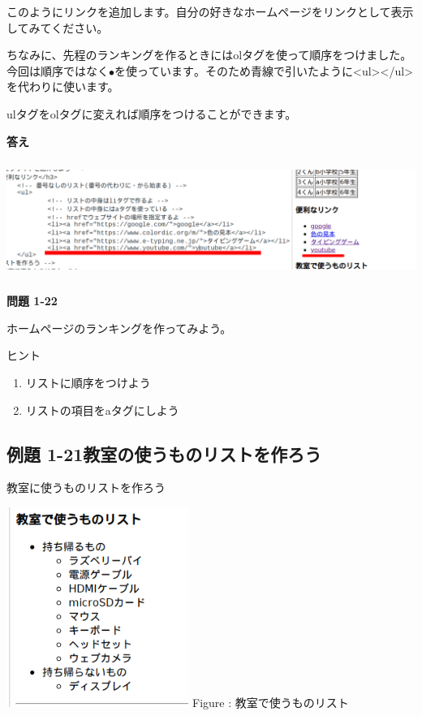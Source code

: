 \documentclass[a4paper,12pt]{jarticle}
\begin{document}
\flushleft
このようにリンクを追加します。自分の好きなホームページをリンクとして表示してみてください。

ちなみに、先程のランキングを作るときにはolタグを使って順序をつけました。今回は順序ではなく${\bullet}を使っています。そのため青線で引いたように${\textless}ul{\textgreater}{\textless}/ul{\textgreater}を代わりに使います。

ulタグをolタグに変えれば順序をつけることができます。


\bigskip

\textbf{答え}

\centering
\includegraphics[width=14.617cm,height=3.821cm]{textbook-img202.png}

\flushleft
{\bfseries
  問題 1-22}


ホームページのランキングを作ってみよう。

ヒント

\begin{enumerate}
  \item リストに順序をつけよう
  \item リストの項目をaタグにしよう
\end{enumerate}

\clearpage
\subsection{例題
  1-21教室の使うものリストを作ろう}
教室に使うものリストを作ろう

\bigskip
\centering
\begin{minipage}{5.937cm}
  {\upshape
    \includegraphics[width=5.937cm,height=6.498cm]{textbook-img203.png}
    \newline
    Figure : 教室で使うものリスト}
\end{minipage}
\end{document}
